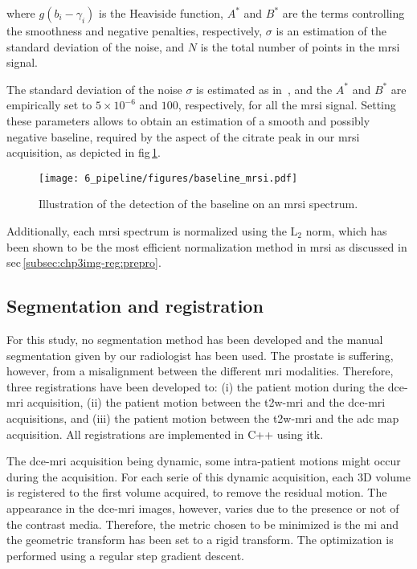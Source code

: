 \noindent where $g(b_i - \gamma_i)$ is the Heaviside function, $A^*$ and $B^*$ are the terms controlling the smoothness and negative penalties, respectively, $\sigma$ is an estimation of the standard deviation of the noise, and $N$ is the total number of points in the \ac{mrsi} signal.

The standard deviation of the noise $\sigma$ is estimated as in~\cite{xi2008baseline}, and the $A^{*}$ and $B^{*}$ are empirically set to $5 \times 10^{-6}$ and $100$, respectively, for all the \ac{mrsi} signal.
Setting these parameters allows to obtain an estimation of a smooth and possibly negative baseline, required by the aspect of the citrate peak in our \ac{mrsi} acquisition, as depicted in \acs{fig}\,\ref{fig:baselinemrsi}.

\begin{figure}
  \centering
  \texttt{[image: 6\_pipeline/figures/baseline\_mrsi.pdf]}
  \caption{Illustration of the detection of the baseline on an \acs*{mrsi} spectrum.}
  \label{fig:baselinemrsi}
\end{figure}

Additionally, each \ac{mrsi} spectrum is normalized using the L$_2$ norm, which has been shown to be the most efficient normalization method in \ac{mrsi} as discussed in \acs{sec}\,\ref{subsec:chp3img-reg:prepro}.

\subsection{Segmentation and registration}\label{subsec:chp6:method:Seg-Reg}

For this study, no segmentation method has been developed and the manual segmentation given by our radiologist has been used.
The prostate is suffering, however, from a misalignment between the different \ac{mri} modalities.
Therefore, three registrations have been developed to: (i) the patient motion during the \ac{dce}-\ac{mri} acquisition, (ii) the patient motion between the \ac{t2w}-\ac{mri} and the \ac{dce}-\ac{mri} acquisitions, and (iii) the patient motion between the \ac{t2w}-\ac{mri} and the \ac{adc} map acquisition.
All registrations are implemented in C++ using \ac{itk}.

The \ac{dce}-\ac{mri} acquisition being dynamic, some intra-patient motions might occur during the acquisition.
For each serie of this dynamic acquisition, each 3D volume is registered to the first volume acquired, to remove the residual motion.
The appearance in the \ac{dce}-\ac{mri} images, however, varies due to the presence or not of the contrast media.
Therefore, the metric chosen to be minimized is the \ac{mi} and the geometric transform has been set to a rigid transform.
The optimization is performed using a regular step gradient descent.

